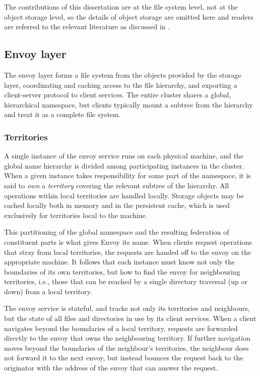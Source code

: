 The contributions of this dissertation are at the file system level, not at the object storage level, so the details of object storage are omitted here and readers are referred to the relevant literature as discussed in .

\subsection{Envoy layer}

The envoy layer forms a file system from the objects provided by the storage layer, coordinating and caching access to the file hierarchy, and exporting a client-server protocol to client services. The entire cluster shares a global, hierarchical namespace, but clients typically mount a subtree from the hierarchy and treat it as a complete file system.

\subsubsection{Territories}

A single instance of the envoy service runs on each physical machine, and the global name hierarchy is divided among participating instances in the cluster. When a given instance takes responsibility for some part of the namespace, it is said to \emph{own} a \emph{territory} covering the relevant subtree of the hierarchy. All operations within local territories are handled locally. Storage objects may be cached locally both in memory and in the persistent cache, which is used exclusively for territories local to the machine.

This partitioning of the global namespace and the resulting federation of constituent parts is what gives Envoy its name. When clients request operations that stray from local territories, the requests are handed off to the envoy on the appropriate machine. It follows that each instance must know not only the boundaries of its own territories, but how to find the envoy for neighbouring territories, i.e., those that can be reached by a single directory traversal (up or down) from a local territory.

The envoy service is stateful, and tracks not only its territories and neighbours, but the state of all files and directories in use by its client services. When a client navigates beyond the boundaries of a local territory, requests are forwarded directly to the envoy that owns the neighbouring territory. If further navigation moves beyond the boundaries of the neighbour's territories, the neighbour does not forward it to the next envoy, but instead bounces the request back to the originator with the address of the envoy that can answer the request.

